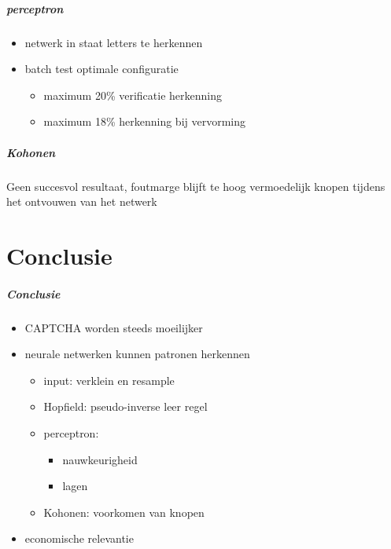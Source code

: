 \documentclass{beamer}
\begin{document}
\begin{frame}
  \frametitle{perceptron}
    \begin{itemize}
      \item netwerk in staat letters te herkennen
      \item batch test optimale configuratie
        \begin{itemize}
          \item maximum 20\% verificatie herkenning
          \item maximum 18\% herkenning bij vervorming
        \end{itemize}
    \end{itemize}
    \vfill
\end{frame}
\begin{frame}
  \frametitle{Kohonen}
  Geen succesvol resultaat, foutmarge blijft te hoog
  \vfill
  vermoedelijk knopen tijdens het ontvouwen van het netwerk
\end{frame}
\part{Conclusie}
\begin{frame}
  \frametitle{Conclusie}
  \begin{itemize}
    \item<+-> CAPTCHA worden steeds moeilijker
    \item<+-> neurale netwerken kunnen patronen herkennen
      \begin{itemize}
        \item<+-> input: verklein en resample
        \item<+-> Hopfield: pseudo-inverse leer regel
        \item<+-> perceptron:
          \begin{itemize}
            \item nauwkeurigheid
            \item lagen
          \end{itemize}
        \item<+-> Kohonen: voorkomen van knopen 
      \end{itemize}
    \item<+-> economische relevantie
  \end{itemize}
\end{frame}
\end{document}
